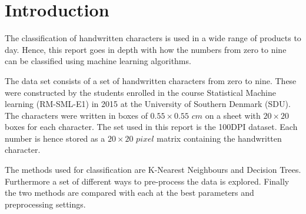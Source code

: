 \section{Introduction}

The classification of handwritten characters is used in a wide range of products to day.
Hence, this report goes in depth with how the numbers from zero to nine can be classified using machine learning algorithms.

The data set consists of a set of handwritten characters from zero to nine.
These were constructed by the students enrolled in the course Statistical Machine learning (RM-SML-E1) in 2015 at the University of Southern Denmark (SDU).
The characters were written in boxes of $0.55 \times 0.55 \textit{ cm}$ on a sheet with $20 \times 20$ boxes for each character.
The set used in this report is the 100DPI dataset.
Each number is hence stored as a $20 \times 20 \textit{ pixel}$ matrix containing the handwritten character.

The methods used for classification are K-Nearest Neighbours and Decision Trees.
Furthermore a set of different ways to pre-process the data is explored.
Finally the two methods are compared with each at the best parameters and preprocessing settings.



